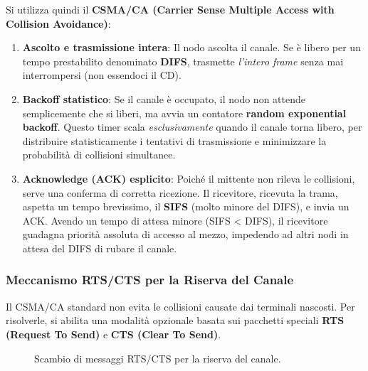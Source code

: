 Si utilizza quindi il \textbf{CSMA/CA (Carrier Sense Multiple Access with Collision Avoidance)}:
\begin{enumerate}
    \item \textbf{Ascolto e trasmissione intera}: Il nodo ascolta il canale. Se è libero per un tempo prestabilito denominato \textbf{DIFS}, trasmette \textit{l'intero frame} senza mai interrompersi (non essendoci il CD).
    \item \textbf{Backoff statistico}: Se il canale è occupato, il nodo non attende semplicemente che si liberi, ma avvia un contatore \textbf{random exponential backoff}. Questo timer scala \textit{esclusivamente} quando il canale torna libero, per distribuire statisticamente i tentativi di trasmissione e minimizzare la probabilità di collisioni simultanee.
    \item \textbf{Acknowledge (ACK) esplicito}: Poiché il mittente non rileva le collisioni, serve una conferma di corretta ricezione. Il ricevitore, ricevuta la trama, aspetta un tempo brevissimo, il \textbf{SIFS} (molto minore del DIFS), e invia un ACK. Avendo un tempo di attesa minore (SIFS < DIFS), il ricevitore guadagna priorità assoluta di accesso al mezzo, impedendo ad altri nodi in attesa del DIFS di rubare il canale.
\end{enumerate}

\subsubsection{Meccanismo RTS/CTS per la Riserva del Canale}
Il CSMA/CA standard non evita le collisioni causate dai terminali nascosti. Per risolverle, si abilita una modalità opzionale basata sui pacchetti speciali \textbf{RTS (Request To Send)} e \textbf{CTS (Clear To Send)}.

\begin{figure}[H]
    \centering
    \caption{Scambio di messaggi RTS/CTS per la riserva del canale.}
    \label{fig:rts-cts}
\end{figure}

